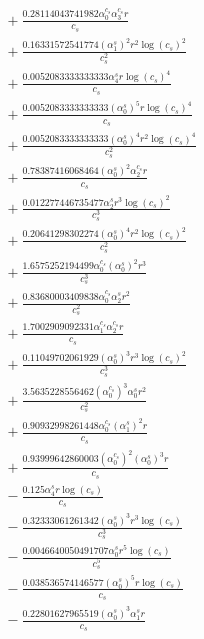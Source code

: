 \documentclass[10pt]{article}
\begin{document}
\begin{align*}
&{}  + \frac{0.28114043741982 \alpha_{0}^{c_s} \alpha_{3}^{c_s} r}{c_{s}} \\
&{}  + \frac{0.16331572541774 \left(\alpha_{1}^s\right)^{2} r^{2} \log{\left(c_{s} \right)}^{2}}{c_{s}^{2}} \\
&{}  + \frac{0.0052083333333333 \alpha_{4}^s r \log{\left(c_{s} \right)}^{4}}{c_{s}} \\
&{}  + \frac{0.0052083333333333 \left(\alpha_{0}^s\right)^{5} r \log{\left(c_{s} \right)}^{4}}{c_{s}} \\
&{}  + \frac{0.0052083333333333 \left(\alpha_{0}^s\right)^{4} r^{2} \log{\left(c_{s} \right)}^{4}}{c_{s}^{2}} \\
&{}  + \frac{0.78387416068464 \left(\alpha_{0}^s\right)^{2} \alpha_{2}^{c_s} r}{c_{s}} \\
&{}  + \frac{0.012277446735477 \alpha_{2}^s r^{3} \log{\left(c_{s} \right)}^{2}}{c_{s}^{3}} \\
&{}  + \frac{0.20641298302274 \left(\alpha_{0}^s\right)^{4} r^{2} \log{\left(c_{s} \right)}^{2}}{c_{s}^{2}} \\
&{}  + \frac{1.6575252194499 \alpha_{0}^{c_s} \left(\alpha_{0}^s\right)^{2} r^{3}}{c_{s}^{3}} \\
&{}  + \frac{0.83680003409838 \alpha_{0}^{c_s} \alpha_{2}^s r^{2}}{c_{s}^{2}} \\
&{}  + \frac{1.7002909092331 \alpha_{1}^{c_s} \alpha_{2}^{c_s} r}{c_{s}} \\
&{}  + \frac{0.11049702061929 \left(\alpha_{0}^s\right)^{3} r^{3} \log{\left(c_{s} \right)}^{2}}{c_{s}^{3}} \\
&{}  + \frac{3.5635228556462 \left(\alpha_{0}^{c_s}\right)^{3} \alpha_{0}^s r^{2}}{c_{s}^{2}} \\
&{}  + \frac{0.90932998261448 \alpha_{0}^{c_s} \left(\alpha_{1}^s\right)^{2} r}{c_{s}} \\
&{}  + \frac{0.93999642860003 \left(\alpha_{0}^{c_s}\right)^{2} \left(\alpha_{0}^s\right)^{3} r}{c_{s}} \\
&{}  - \frac{0.125 \alpha_{4}^s r \log{\left(c_{s} \right)}}{c_{s}} \\
&{}  - \frac{0.32333061261342 \left(\alpha_{0}^s\right)^{3} r^{3} \log{\left(c_{s} \right)}}{c_{s}^{3}} \\
&{}  - \frac{0.0046640050491707 \alpha_{0}^s r^{5} \log{\left(c_{s} \right)}}{c_{s}^{5}} \\
&{}  - \frac{0.038536574146577 \left(\alpha_{0}^s\right)^{5} r \log{\left(c_{s} \right)}}{c_{s}} \\
&{}  - \frac{0.22801627965519 \left(\alpha_{0}^s\right)^{3} \alpha_{1}^s r}{c_{s}} \\

\end{align*}
\end{document}
